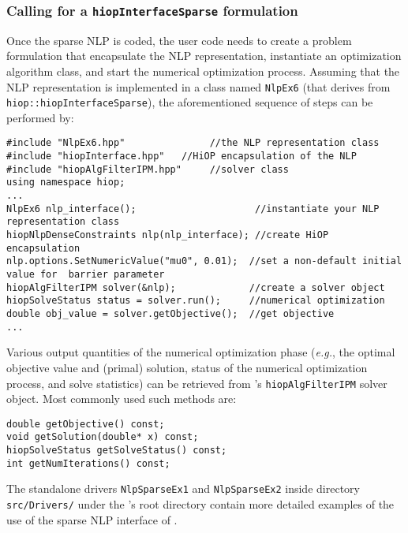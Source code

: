 \subsubsection{Calling \Hi for a \texttt{hiopInterfaceSparse} formulation}
Once the sparse NLP is coded,  the  user code needs to create a \Hi problem formulation that encapsulate the NLP representation, instantiate an optimization algorithm class, and start the numerical optimization process. Assuming that the NLP representation is implemented in a class named \texttt{NlpEx6} (that derives from \texttt{hiop::hiopInterfaceSparse}), the aforementioned sequence of steps can be performed by:
\begin{lstlisting}
#include "NlpEx6.hpp"               //the NLP representation class
#include "hiopInterface.hpp"   //HiOP encapsulation of the NLP
#include "hiopAlgFilterIPM.hpp"     //solver class
using namespace hiop;
...
NlpEx6 nlp_interface();                     //instantiate your NLP representation class
hiopNlpDenseConstraints nlp(nlp_interface); //create HiOP encapsulation
nlp.options.SetNumericValue("mu0", 0.01);  //set a non-default initial value for  barrier parameter
hiopAlgFilterIPM solver(&nlp);             //create a solver object
hiopSolveStatus status = solver.run();     //numerical optimization
double obj_value = solver.getObjective();  //get objective
...
\end{lstlisting}
Various output quantities of the numerical optimization phase (\textit{e.g.}, the optimal objective value and (primal) solution, status of the numerical optimization process, and solve statistics) can be retrieved from \Hi's \texttt{hiopAlgFilterIPM} solver object. Most commonly used such methods are: 
\begin{lstlisting}
double getObjective() const;
void getSolution(double* x) const;
hiopSolveStatus getSolveStatus() const;
int getNumIterations() const;
\end{lstlisting} 
The standalone drivers \texttt{NlpSparseEx1} and \texttt{NlpSparseEx2} inside directory \texttt{src/Drivers/} under the \Hi's root directory contain more detailed examples of the use of the sparse NLP interface of \Hi.
